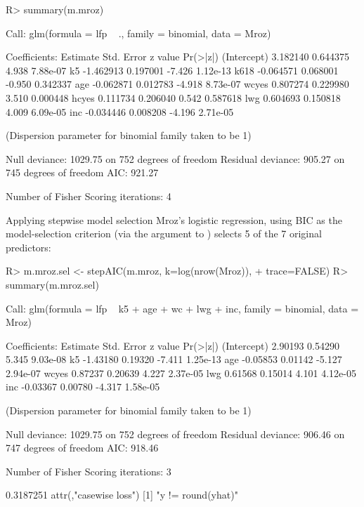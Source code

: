 \documentclass[
]{jss}
\begin{document}
\begin{CodeChunk}
\begin{CodeInput}
R> summary(m.mroz)
\end{CodeInput}
\begin{CodeOutput}

Call:
glm(formula = lfp ~ ., family = binomial, data = Mroz)

Coefficients:
             Estimate Std. Error z value Pr(>|z|)
(Intercept)  3.182140   0.644375   4.938 7.88e-07
k5          -1.462913   0.197001  -7.426 1.12e-13
k618        -0.064571   0.068001  -0.950 0.342337
age         -0.062871   0.012783  -4.918 8.73e-07
wcyes        0.807274   0.229980   3.510 0.000448
hcyes        0.111734   0.206040   0.542 0.587618
lwg          0.604693   0.150818   4.009 6.09e-05
inc         -0.034446   0.008208  -4.196 2.71e-05

(Dispersion parameter for binomial family taken to be 1)

    Null deviance: 1029.75  on 752  degrees of freedom
Residual deviance:  905.27  on 745  degrees of freedom
AIC: 921.27

Number of Fisher Scoring iterations: 4
\end{CodeOutput}
\end{CodeChunk}

Applying stepwise model selection Mroz's logistic regression, using BIC
as the model-selection criterion (via the argument
 to ) selects 5 of the 7
original predictors:

\begin{CodeChunk}
\begin{CodeInput}
R> m.mroz.sel <- stepAIC(m.mroz, k=log(nrow(Mroz)),
+                       trace=FALSE)
R> summary(m.mroz.sel)
\end{CodeInput}
\begin{CodeOutput}

Call:
glm(formula = lfp ~ k5 + age + wc + lwg + inc, family = binomial, 
    data = Mroz)

Coefficients:
            Estimate Std. Error z value Pr(>|z|)
(Intercept)  2.90193    0.54290   5.345 9.03e-08
k5          -1.43180    0.19320  -7.411 1.25e-13
age         -0.05853    0.01142  -5.127 2.94e-07
wcyes        0.87237    0.20639   4.227 2.37e-05
lwg          0.61568    0.15014   4.101 4.12e-05
inc         -0.03367    0.00780  -4.317 1.58e-05

(Dispersion parameter for binomial family taken to be 1)

    Null deviance: 1029.75  on 752  degrees of freedom
Residual deviance:  906.46  on 747  degrees of freedom
AIC: 918.46

Number of Fisher Scoring iterations: 3
\end{CodeOutput}
\begin{CodeOutput}
[1] 0.3187251
attr(,"casewise loss")
[1] "y != round(yhat)"
\end{CodeOutput}
\end{CodeChunk}
\end{document}

